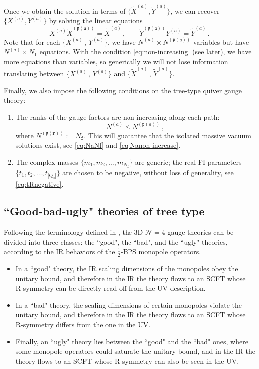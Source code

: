 \documentclass[12pt,a4paper]{article}
\renewcommand{\(}{\left(}
\renewcommand{\)}{\right)}
\renewcommand{\(}{\left(}
\renewcommand{\)}{\right)}
\begin{document}
Once we obtain the solution in terms of  $\{\tilde{X}^{(a)},\tilde{Y}^{(a)}\}$, we can recover $\{X^{(a)},Y^{(a)}\}$ by solving the linear equations
\begin{equation}
X^{(a)}\tilde{X}^{(\mathfrak{p(a)})}=\tilde{X}^{(a)}\,,\qquad \tilde{Y}^{(\mathfrak{p(a)})}Y^{(a)}=\tilde{Y}^{(a)}\,.
\end{equation}
Note that for each $\{X^{(a)}\, ,\, Y^{(a)}\}$, we have $N^{(a)}\times N^{(\mathfrak{p(a)})}$ variables but have $N^{(a)}\times N_{\mathtt{f}}$ equations. 
With the condition \eqref{eq:non-increasing} (see later), we have more equations than variables, so generically we will not lose information translating between $\{X^{(a)}\, ,\, Y^{(a)}\}$ and $\{\tilde{X}^{(a)}\, ,\, \tilde{Y}^{(a)}\}$.

\medskip

Finally,  we also impose the following conditions on the tree-type quiver gauge theory:
\begin{enumerate}
\item The ranks of the gauge factors are non-increasing along each path:
\begin{equation}\label{eq:non-increasing}
 N^{(a)}  \leq N^{(\mathfrak{p}(a))} \,,
\end{equation} 
where $N^{(\mathfrak{p}(\mathtt{r}))}:=N_{\mathtt{f}}$.
This will guarantee that the isolated massive vacuum solutions exist, see \eqref{eq:NaNf} and \eqref{eq:Nanon-increase}.
\item 
The complex masses $\{m_1,m_2,\dots,m_{N_{\mathtt{f}}}\}$ are generic; the real FI parameters $\{t_1,t_2,\dots,t_{|\mathrm{Q}_0|}\}$ are chosen to be negative, without loss of generality, see \eqref{eq:tRnegative}. 

\end{enumerate}

\subsection{``Good-bad-ugly" theories of tree type}

Following the terminology defined in \cite{Gaiotto_2009}, the 3D $\mathcal{N}=4$ gauge theories can be divided into three classes: the ``good", the ``bad", and the ``ugly" theories, according to the IR behaviors of the $\frac{1}{2}$-BPS monopole operators. 
\begin{itemize}
\item In a ``good" theory, the IR scaling dimensions of the monopoles obey the unitary bound, and therefore in the IR the theory flows to an SCFT whose R-symmetry can be directly read off from the UV description. 
\item In a ``bad" theory, the scaling dimensions of certain monopoles violate the unitary bound, and therefore in the IR the theory flows to an SCFT whose R-symmetry differs from the one in the UV. 
\item Finally, an ``ugly" theory lies between the ``good" and the ``bad" ones, where some monopole operators could saturate the unitary bound, and in the IR the theory flows to an SCFT whose R-symmetry can also be seen in the UV. 
\end{itemize}
\end{document}
